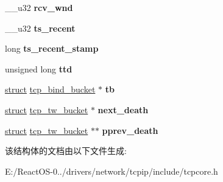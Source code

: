 \begin{DoxyCompactItemize}
\mbox{\label{structtcp__tw__bucket_a2a1028d818a25e3e3c1817feb9113576}} 
\+\_\+\+\_\+u32 {\bfseries rcv\+\_\+wnd}
\item 
\mbox{\label{structtcp__tw__bucket_a569e10c2cea6c3aced648b39b7c9f8c8}} 
\+\_\+\+\_\+u32 {\bfseries ts\+\_\+recent}
\item 
\mbox{\label{structtcp__tw__bucket_a0f5775595ea87dadd232509e98375cf2}} 
long {\bfseries ts\+\_\+recent\+\_\+stamp}
\item 
\mbox{\label{structtcp__tw__bucket_a12f17eda619113f263470929f8285764}} 
unsigned long {\bfseries ttd}
\item 
\mbox{\label{structtcp__tw__bucket_aee662b7c96f961d18a702f7a638f33b1}} 
\hyperlink{interfacestruct}{struct} \hyperlink{structtcp__bind__bucket}{tcp\+\_\+bind\+\_\+bucket} $\ast$ {\bfseries tb}
\item 
\mbox{\label{structtcp__tw__bucket_aa08f64d6104c89ca0e33d4b0600a8ece}} 
\hyperlink{interfacestruct}{struct} \hyperlink{structtcp__tw__bucket}{tcp\+\_\+tw\+\_\+bucket} $\ast$ {\bfseries next\+\_\+death}
\item 
\mbox{\label{structtcp__tw__bucket_a5e04cb5177e8c30b979c6f82f88e5046}} 
\hyperlink{interfacestruct}{struct} \hyperlink{structtcp__tw__bucket}{tcp\+\_\+tw\+\_\+bucket} $\ast$$\ast$ {\bfseries pprev\+\_\+death}
\end{DoxyCompactItemize}


该结构体的文档由以下文件生成\+:\begin{DoxyCompactItemize}
\item 
E\+:/\+React\+O\+S-\/0../drivers/network/tcpip/include/tcpcore.\+h\end{DoxyCompactItemize}
